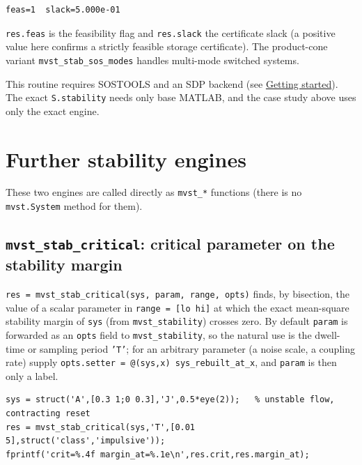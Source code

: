 \documentclass[11pt,oneside]{report}
\newcommand{\code}[1]{\texttt{#1}}
\begin{document}
\begin{lstlisting}[style=outputstyle]
feas=1  slack=5.000e-01
\end{lstlisting}

\code{res.feas} is the feasibility flag and \code{res.slack} the certificate slack (a
positive value here confirms a strictly feasible storage certificate). The
product-cone variant \code{mvst\_stab\_sos\_modes} handles multi-mode switched systems.

This routine requires SOSTOOLS and an SDP backend (see
\protect\hyperlink{chap:01-getting-started}{Getting started}). The exact \code{S.stability} needs only
base MATLAB, and the case study above uses only the exact engine.

\hypertarget{further-stability-engines}{%
\section{Further stability engines}\label{further-stability-engines}}

These two engines are called directly as \code{mvst\_*} functions (there is no
\code{mvst.System} method for them).

\hypertarget{mvst_stab_critical-critical-parameter-on-the-stability-margin}{%
\subsection{\texorpdfstring{\code{mvst\_stab\_critical}: critical parameter on the stability margin}{mvst\_stab\_critical: critical parameter on the stability margin}}\label{mvst_stab_critical-critical-parameter-on-the-stability-margin}}

\code{res = mvst\_stab\_critical(sys, param, range, opts)} finds, by bisection, the
value of a scalar parameter in \code{range = [lo hi]} at which the exact
mean-square stability margin of \code{sys} (from \code{mvst\_stability}) crosses zero. By
default \code{param} is forwarded as an \code{opts} field to \code{mvst\_stability}, so the
natural use is the dwell-time or sampling period \code{'T'}; for an arbitrary
parameter (a noise scale, a coupling rate) supply \code{opts.setter = @(sys,x) sys\_rebuilt\_at\_x}, and \code{param} is then only a label.

\begin{lstlisting}[style=matlabstyle]
sys = struct('A',[0.3 1;0 0.3],'J',0.5*eye(2));   % unstable flow, contracting reset
res = mvst_stab_critical(sys,'T',[0.01 5],struct('class','impulsive'));
fprintf('crit=%.4f margin_at=%.1e\n',res.crit,res.margin_at);
\end{lstlisting}
\end{document}
